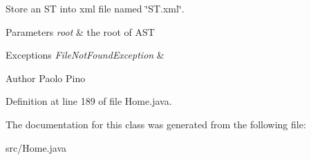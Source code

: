 Store an S\-T into xml file named \char`\"{}\-S\-T.\-xml\char`\"{}. 


\begin{DoxyParams}{Parameters}
{\em root} & the root of A\-S\-T \\
\hline
\end{DoxyParams}

\begin{DoxyExceptions}{Exceptions}
{\em File\-Not\-Found\-Exception} & \\
\hline
\end{DoxyExceptions}
\begin{DoxyAuthor}{Author}
Paolo Pino 
\end{DoxyAuthor}


Definition at line 189 of file Home.\-java.



The documentation for this class was generated from the following file\-:\begin{DoxyCompactItemize}
\item 
src/Home.\-java\end{DoxyCompactItemize}
